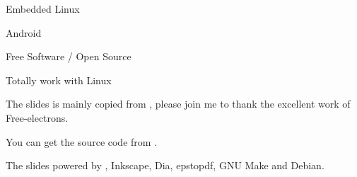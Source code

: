 \startitemize
    \item Embedded Linux
    \item Android
    \item Free Software / Open Source
    \item Totally work with Linux
\stopitemize

\startitemize
\item The slides is mainly copied from , please join me to thank the excellent work of Free-electrons.

\item You can get the source code from .

\item The slides powered by \CONTEXT, Inkscape, Dia, epstopdf, GNU Make and Debian.
\stopitemize
